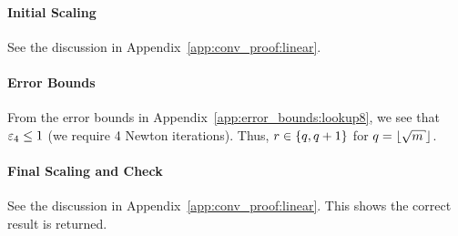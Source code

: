 \paragraph{Initial Scaling}
See the discussion in Appendix~\ref{app:conv_proof:linear}.

\paragraph{Error Bounds}
From the error bounds in Appendix~\ref{app:error_bounds:lookup8},
we see that $\varepsilon_{4}\le1$ (we require 4 Newton iterations).
Thus, $r\in\left\{ q,q+1 \right\}$ for $q = \floor{\sqrt{m}}$.

\paragraph{Final Scaling and Check}
See the discussion in Appendix~\ref{app:conv_proof:linear}.
This shows the correct result is returned.
